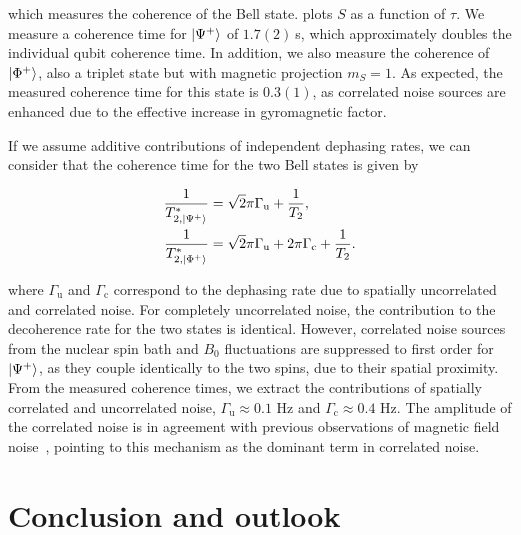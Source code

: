 which measures the coherence of the Bell state.  plots $S$ as a function of $\tau$. We measure a coherence time for $\ket{\Psi^+}$ of $1.7(2)~$s, which approximately doubles the individual qubit coherence time. In addition, we also measure the coherence of $\ket{\Phi^+}$, also a triplet state but with magnetic projection $m_S=1$. As expected, the measured coherence time for this state is $0.3(1)$, as correlated noise sources are enhanced due to the effective increase in gyromagnetic factor.

If we assume additive contributions of independent dephasing rates, we can consider that the coherence time for the two Bell states is given by

\begin{align}
\begin{split}
    \frac{1}{T_{2,\ket{\Psi^+}}^*} &= \sqrt{2}\pi\Gamma_\text{u} + \frac{1}{T_2}, \\
    \frac{1}{T_{2, \ket{\Phi^+}}^*} &= \sqrt{2}\pi\Gamma_\text{u} + 2\pi\Gamma_\text{c} + \frac{1}{T_2}.
\end{split}
\end{align} 

where $\Gamma_\text{u}$ and $\Gamma_\text{c}$ correspond to the dephasing rate due to spatially uncorrelated and correlated noise. For completely uncorrelated noise, the contribution to the decoherence rate for the two states is identical. However, correlated noise sources from the nuclear spin bath and $B_0$ fluctuations are suppressed to first order for $\ket{\Psi^+}$, as they couple identically to the two spins, due to their spatial proximity. From the measured coherence times, we extract the contributions of spatially correlated and uncorrelated noise, $\Gamma_\text{u} \approx 0.1 $ Hz and $\Gamma_\text{c} \approx 0.4 $ Hz. The amplitude of the correlated noise is in agreement with previous observations of magnetic field noise~, pointing to this mechanism as the dominant term in correlated noise.

\section{Conclusion and outlook}

